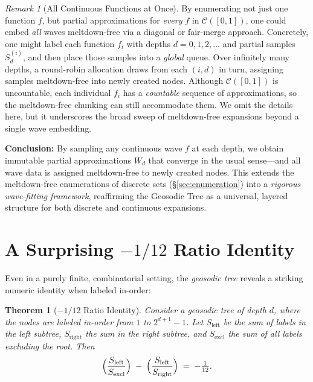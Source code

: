\documentclass[11pt]{article}
\newtheorem{theorem}{Theorem}
\theoremstyle{definition}
\theoremstyle{remark}
\newtheorem*{remark}{Remark}
\begin{document}
\begin{remark}[All Continuous Functions at Once]
  By enumerating not just one function $f$, but partial approximations for
  \emph{every} $f$ in $\mathcal{C}([0,1])$, one could embed \emph{all} waves meltdown-free
  via a diagonal or fair-merge approach. Concretely, one might label each function $f_i$
  with depths $d=0,1,2,\dots$ and partial samples $S_d^{(i)}$, and then place those
  samples into a \emph{global} queue. Over infinitely many depths, a round-robin allocation
  draws from each $(i,d)$ in turn, assigning samples meltdown-free into newly created nodes.
  Although $\mathcal{C}([0,1])$ is uncountable, each individual $f_i$ has a \emph{countable}
  sequence of approximations, so the meltdown-free chunking can still accommodate them.
  We omit the details here, but it underscores the broad sweep of meltdown-free expansions
  beyond a single wave embedding.
\end{remark}

\smallskip

\noindent
\textbf{Conclusion:} By sampling any continuous wave $f$ at each depth, we obtain
immutable partial approximations $W_d$ that converge in the usual sense---and
all wave data is assigned meltdown-free to newly created nodes. This extends
the meltdown-free enumerations of discrete sets (\S\ref{sec:enumeration}) into a
\emph{rigorous wave-fitting framework}, reaffirming the Geosodic Tree as a
universal, layered structure for both discrete and continuous expansions.
 \section{A Surprising \texorpdfstring{$-1/12$}{-1/12} Ratio Identity}
\label{sec:ratio}

Even in a purely finite, combinatorial setting, the \emph{geosodic tree} 
reveals a striking numeric identity when labeled in-order:

\begin{theorem}[$-1/12$ Ratio Identity]
\label{thm:minus-twelfth}
Consider a geosodic tree of depth $d$, where the nodes are labeled in-order 
from $1$ to $2^{d+1}-1$. Let $S_{\text{left}}$ be the sum of labels in the 
left subtree, $S_{\text{right}}$ the sum in the right subtree, and 
$S_{\text{excl}}$ the sum of all labels excluding the root. Then
\[
\Bigl(\frac{S_{\text{left}}}{S_{\text{excl}}}\Bigr)
\;-\;
\Bigl(\frac{S_{\text{left}}}{S_{\text{right}}}\Bigr)
\;=\;
-\tfrac{1}{12}.
\]
\end{theorem}
\end{document}
